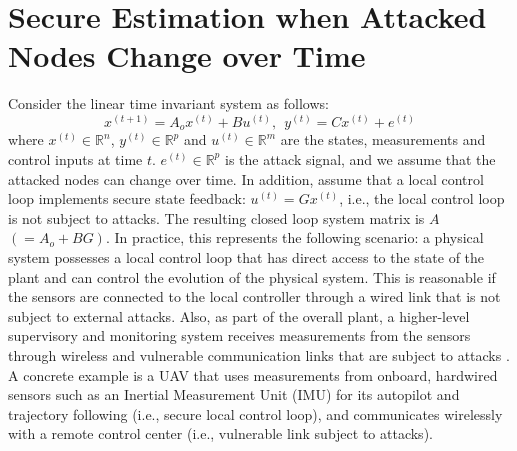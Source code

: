 \documentclass[twocolumn]{autart}    %
\newtheorem{Def}{\bf{Definition}}
\newcommand{\rev}[1]{{\normalsize{{{\color{blue}#1}}}}}
\begin{document}
\section{Secure Estimation when Attacked Nodes Change over Time }  \label{sec:main}
\vspace{-0.4cm}
Consider the linear time invariant system as follows:
\begin{equation}
x^{(t+1)} = A_o x^{(t)} + B u^{(t)}, ~~ y^{(t)} = C x ^{(t)} + e^{(t) }
\label{eq:system_model_se}
\end{equation} 
where $x^{(t)} \in \mathbb{R}^n$, $y^{(t)}  \in \mathbb{R}^p$ and $u^{(t)} \in \mathbb{R}^m$ are the states, measurements and control inputs at time $t$. $e^{(t)} \in \mathbb{R}^p$ is the attack signal, and we assume that the attacked nodes can change over time. 
\rev{
In addition, assume that a local control loop implements secure state feedback: $u^{(t)} = Gx^{(t)}$, i.e., the local control loop is not subject to attacks. The resulting closed loop system matrix is $A$ $(=A_o+BG)$. 
In practice, this represents the following scenario: a physical system possesses a local control loop that has direct access to the state of the plant and can control the evolution of the physical system. This is reasonable if the sensors are connected to the local controller through a wired link that is not subject to external attacks. Also, as part of the overall plant, a higher-level supervisory and monitoring system receives measurements from the sensors through wireless and vulnerable communication links that are subject to attacks \cite{Fawzi2014}. 
A concrete example is a UAV that uses measurements from onboard, hardwired sensors such as an Inertial Measurement Unit (IMU) for its autopilot and trajectory following (i.e., secure local control loop), and communicates wirelessly with a remote control center (i.e., vulnerable link subject to attacks).%
}
\vspace{-0.4cm}
\end{document}
